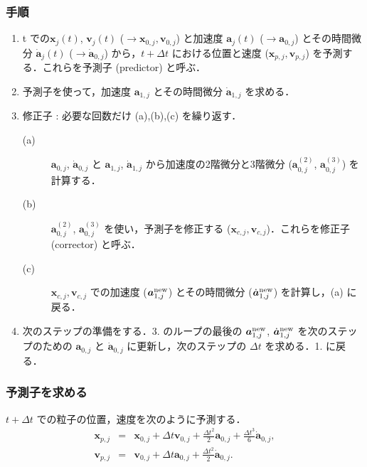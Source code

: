 \documentclass[11pt,a4paper,oneside,onecolumn]{jreport}
\begin{document}
\subsubsection{手順}
\begin{enumerate}
\item t での${\bm x}_j (t)$, ${\bm v}_j (t)$ ($\to {\bm x}_{0,j} , {\bm v}_{0,j}$) と加速度 ${\bm a}_j (t)$ ($\to {\bm a}_{0,j}$) とその時間微分 $\dot{{\bm a}}_j (t)$ ($\to \dot{{\bm a}}_{0,j}$) から，$t + \Delta t$ における位置と速度 (${\bm x}_{p,j} , {\bm v}_{p,j}$) を予測する．これらを予測子 (predictor) と呼ぶ．
\item 予測子を使って，加速度 ${\bm a}_{1,j}$ とその時間微分 $\dot{{\bm a}}_{1,j}$ を求める．
\item 修正子 : 必要な回数だけ (a),(b),(c) を繰り返す．
\begin{description}
\item[(a)] ${\bm a}_{0,j}$, $\dot{{\bm a}}_{0,j}$ と ${\bm a}_{1,j}$, $\dot{{\bm a}}_{1,j}$ から加速度の2階微分と3階微分 (${\bm a}_{0,j}^{(2)}$, ${\bm a}_{0,j}^{(3)}$) を計算する．
\item[(b)] ${\bm a}_{0,j}^{(2)}$, ${\bm a}_{0,j}^{(3)}$ を使い，予測子を修正する (${\bm x}_{c,j} , {\bm v}_{c,j}$)．これらを修正子 (corrector) と呼ぶ．
\item[(c)] ${\bm x}_{c,j} , {\bm v}_{c,j}$ での加速度 (${\bm a}_{1,j}^{{\rm new}}$) とその時間微分 ($\dot{{\bm a}}_{1,j}^{{\rm new}}$) を計算し，(a) に戻る．
\end{description}
\item 次のステップの準備をする．3. のループの最後の ${\bm a}_{1,j}^{{\rm new}}$, $\dot{{\bm a}}_{1,j}^{{\rm new}}$ を次のステップのための ${\bm a}_{0,j}$ と $\dot{{\bm a}}_{0,j}$ に更新し，次のステップの $\Delta t$ を求める．1. に戻る．
\end{enumerate}

\subsubsection{予測子を求める \label{sec:predictor}}
$t + \Delta t$ での粒子の位置，速度を次のように予測する．
\begin{eqnarray}
{\bm x}_{p,j} & = & {\bm x}_{0,j} + \Delta t {\bm v}_{0,j} + \frac{\Delta t ^2}{2} {\bm a}_{0,j} + \frac{\Delta t ^3}{6} \dot{{\bm a}}_{0,j}, \\
{\bm v}_{p,j} & = & {\bm v}_{0,j} + \Delta t {\bm a}_{0,j} + \frac{\Delta t ^2}{2} \dot{{\bm a}}_{0,j}. 
\end{eqnarray}
\end{document}
